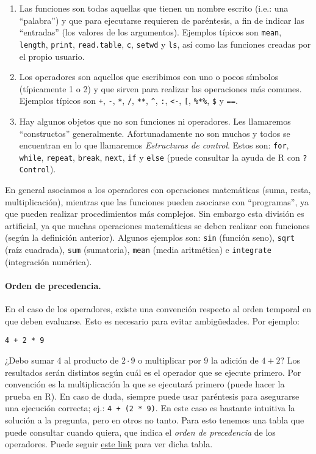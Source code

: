 \documentclass[]{article}
\begin{document}
\begin{enumerate}[1.]
\item
  Las funciones son todas aquellas que tienen un nombre escrito (i.e.:
  una ``palabra'') y que para ejecutarse requieren de paréntesis, a fin
  de indicar las ``entradas'' (los valores de los argumentos). Ejemplos
  típicos son \texttt{mean}, \texttt{length}, \texttt{print},
  \texttt{read.table}, \texttt{c}, \texttt{setwd} y \texttt{ls}, así
  como las funciones creadas por el propio usuario.
\item
  Los operadores son aquellos que escribimos con uno o pocos símbolos
  (típicamente 1 o 2) y que sirven para realizar las operaciones más
  comunes. Ejemplos típicos son \texttt{+}, \texttt{-}, \texttt{*},
  \texttt{/}, \texttt{**}, \texttt{\^{}}, \texttt{:},
  \texttt{\textless{}-}, \texttt{{[}}, \texttt{\%*\%}, \texttt{\$} y
  \texttt{==}.
\item
  Hay algunos objetos que no son funciones ni operadores. Les llamaremos
  ``constructos'' generalmente. Afortunadamente no son muchos y todos se
  encuentran en lo que llamaremos \emph{Estructuras de control}. Estos
  son: \texttt{for}, \texttt{while}, \texttt{repeat}, \texttt{break},
  \texttt{next}, \texttt{if} y \texttt{else} (puede consultar la ayuda
  de R con \texttt{?Control}).
\end{enumerate}
En general asociamos a los operadores con operaciones matemáticas (suma,
resta, multiplicación), mientras que las funciones pueden asociarse con
``programas'', ya que pueden realizar procedimientos más complejos. Sin
embargo esta división es artificial, ya que muchas operaciones
matemáticas se deben realizar con funciones (según la definición
anterior). Algunos ejemplos son: \texttt{sin} (función seno),
\texttt{sqrt} (raíz cuadrada), \texttt{sum} (sumatoria), \texttt{mean}
(media aritmética) e \texttt{integrate} (integración numérica).

\paragraph{Orden de precedencia.}

En el caso de los operadores, existe una convención respecto al orden
temporal en que deben evaluarse. Esto es necesario para evitar
ambigüedades. Por ejemplo:

\begin{verbatim}
4 + 2 * 9
\end{verbatim}
¿Debo sumar 4 al producto de $2 \cdot 9$ o multiplicar por 9 la adición
de $4 + 2$? Los resultados serán distintos según cuál es el operador que
se ejecute primero. Por convención es la multiplicación la que se
ejecutará primero (puede hacer la prueba en R). En caso de duda, siempre
puede usar paréntesis para asegurarse una ejecución correcta; ej.:
\texttt{4 + (2 * 9)}. En este caso es bastante intuitiva la solución a
la pregunta, pero en otros no tanto. Para esto tenemos una tabla que
puede consultar cuando quiera, que indica el \emph{orden de precedencia}
de los operadores. Puede seguir
\href{https://www.dropbox.com/s/7a3q3xgax777zdq/2.0.1-orden-de-precedencia.pdf}{este
link} para ver dicha tabla.
\end{document}
